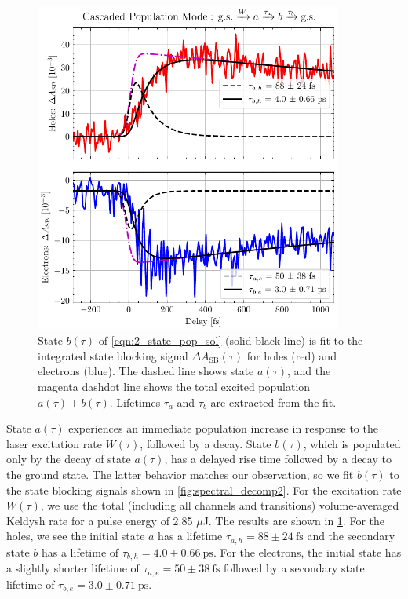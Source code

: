 \begin{figure}
	\centering
	\includegraphics[width=0.9\textwidth]{figures/chap4/SB_eh_2state_model.pdf}
	\caption{State $b(\tau)$ of \cref{eqn:2_state_pop_sol} (solid black line) is fit to the integrated state blocking signal $\Delta A_{\textrm{SB}}(\tau)$ for holes (red) and electrons (blue). The dashed line shows state $a(\tau)$, and the magenta dashdot line shows the total excited population $a(\tau)+b(\tau)$. Lifetimes $\tau_a$ and $\tau_b$ are extracted from the fit.}
	\label{fig:SB_eh_2state_model}
\end{figure}


State $a(\tau)$ experiences an immediate population increase in response to the laser excitation rate $W(\tau)$, followed by a decay. State $b(\tau)$, which is populated only by the decay of state $a(\tau)$, has a delayed rise time followed by a decay to the ground state. The latter behavior matches our observation, so we fit $b(\tau)$ to the state blocking signals shown in \cref{fig:spectral_decomp2}. For the excitation rate $W(\tau)$, we use the total (including all channels and transitions) volume-averaged Keldysh rate for a pulse energy of 2.85 $\mu$J. The results are shown in \cref{fig:SB_eh_2state_model}. For the holes, we see the initial state $a$ has a lifetime $\tau_{a,h} = 88 \pm 24 \ \textrm{fs}$ and the secondary state $b$ has a lifetime of $\tau_{b,h} = 4.0 \pm 0.66 \ \textrm{ps}$. For the electrons, the initial state has a slightly shorter lifetime of ${\tau_{a,e} = 50 \pm 38 \ \textrm{fs}}$ followed by a secondary state lifetime of ${\tau_{b,e} = 3.0 \pm 0.71 \ \textrm{ps}}$.

